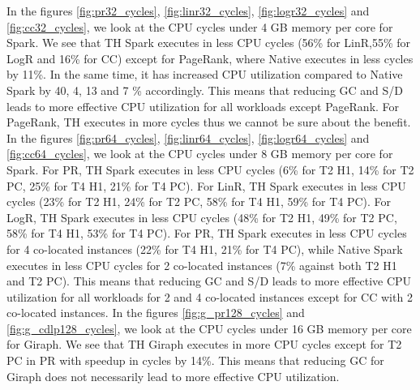 In the figures \ref{fig:pr32_cycles}, \ref{fig:linr32_cycles}, \ref{fig:logr32_cycles} and \ref{fig:cc32_cycles}, we look at the CPU cycles under 4 GB memory per core for Spark. We see that TH Spark executes in less CPU cycles (56\% for LinR,55\% for LogR and 16\% for CC) except for PageRank, where Native executes in less cycles by 11\%. In the same time, it has increased CPU utilization compared to Native Spark by 40, 4, 13 and 7 \% accordingly.
This means that reducing GC and S/D leads to more effective CPU utilization for all workloads except PageRank. For PageRank, TH executes in more cycles thus we cannot be sure about the benefit.
In the figures \ref{fig:pr64_cycles}, \ref{fig:linr64_cycles}, \ref{fig:logr64_cycles} and \ref{fig:cc64_cycles}, we look at the CPU cycles under 8 GB memory per core for Spark. For PR, TH Spark executes in less CPU cycles (6\% for T2 H1, 14\% for T2 PC, 25\% for T4 H1, 21\% for T4 PC).
For LinR, TH Spark executes in less CPU cycles (23\% for T2 H1, 24\% for T2 PC, 58\% for T4 H1, 59\% for T4 PC).
For LogR, TH Spark executes in less CPU cycles (48\% for T2 H1, 49\% for T2 PC, 58\% for T4 H1, 53\% for T4 PC).
For PR, TH Spark executes in less CPU cycles for 4 co-located instances (22\% for T4 H1, 21\% for T4 PC), while Native Spark executes in less
CPU cycles for 2 co-located instances (7\% against both T2 H1 and T2 PC).
This means that reducing GC and S/D leads to more effective CPU utilization for all workloads for 2 and 4 co-located instances except for CC with 2 co-located instances.
In the figures \ref{fig:g_pr128_cycles} and \ref{fig:g_cdlp128_cycles}, we look at the CPU cycles under 16 GB memory per core for Giraph. We see that TH Giraph executes in more CPU cycles except for T2 PC in PR with speedup in cycles by 14\%.
This means that reducing GC for Giraph does not necessarily lead to more effective CPU utilization.

